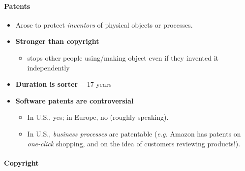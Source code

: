 \documentclass[a4paper]{article}
\providecommand{\tightlist}{%
  \setlength{\itemsep}{0pt}\setlength{\parskip}{0pt}}
\let\oldparagraph\paragraph
\renewcommand{\paragraph}[1]{\oldparagraph{#1}\mbox{}}
\begin{document}
\hypertarget{patents}{%
\paragraph{Patents}\label{patents}}

\begin{itemize}
\tightlist
\item
  Arose to protect \emph{inventors} of physical objects or processes.
\item
  \textbf{Stronger than copyright}

  \begin{itemize}
  \tightlist
  \item
    stops other people using/making object even if they invented it
    independently
  \end{itemize}
\item
  \textbf{Duration is sorter} -\/- 17 years
\item
  \textbf{Software patents are controversial}

  \begin{itemize}
  \tightlist
  \item
    In U.S., yes; in Europe, no (roughly speaking).
  \item
    In U.S., \emph{business processes} are patentable (\emph{e.g.}
    Amazon has patents on \emph{one-click} shopping, and on the idea of
    customers reviewing products!).
  \end{itemize}
\end{itemize}

\hypertarget{copyright}{%
\paragraph{Copyright}\label{copyright}}
\end{document}
